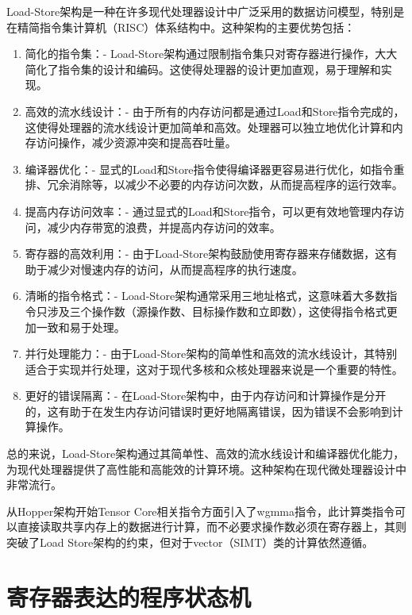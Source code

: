 Load-Store架构是一种在许多现代处理器设计中广泛采用的数据访问模型，特别是在精简指令集计算机（RISC）体系结构中。这种架构的主要优势包括：

\begin{enumerate}
\item 简化的指令集：- Load-Store架构通过限制指令集只对寄存器进行操作，大大简化了指令集的设计和编码。这使得处理器的设计更加直观，易于理解和实现。

\item 高效的流水线设计：- 由于所有的内存访问都是通过Load和Store指令完成的，这使得处理器的流水线设计更加简单和高效。处理器可以独立地优化计算和内存访问操作，减少资源冲突和提高吞吐量。

\item 编译器优化：- 显式的Load和Store指令使得编译器更容易进行优化，如指令重排、冗余消除等，以减少不必要的内存访问次数，从而提高程序的运行效率。

\item 提高内存访问效率：- 通过显式的Load和Store指令，可以更有效地管理内存访问，减少内存带宽的浪费，并提高内存访问的效率。

\item 寄存器的高效利用：- 由于Load-Store架构鼓励使用寄存器来存储数据，这有助于减少对慢速内存的访问，从而提高程序的执行速度。

\item 清晰的指令格式：- Load-Store架构通常采用三地址格式，这意味着大多数指令只涉及三个操作数（源操作数、目标操作数和立即数），这使得指令格式更加一致和易于处理。

\item 并行处理能力：- 由于Load-Store架构的简单性和高效的流水线设计，其特别适合于实现并行处理，这对于现代多核和众核处理器来说是一个重要的特性。

\item 更好的错误隔离：- 在Load-Store架构中，由于内存访问和计算操作是分开的，这有助于在发生内存访问错误时更好地隔离错误，因为错误不会影响到计算操作。
\end{enumerate}

总的来说，Load-Store架构通过其简单性、高效的流水线设计和编译器优化能力，为现代处理器提供了高性能和高能效的计算环境。这种架构在现代微处理器设计中非常流行。

从Hopper架构开始Tensor Core相关指令方面引入了wgmma指令，此计算类指令可以直接读取共享内存上的数据进行计算，而不必要求操作数必须在寄存器上，其则突破了Load Store架构的约束，但对于vector（SIMT）类的计算依然遵循。

\section{寄存器表达的程序状态机}

